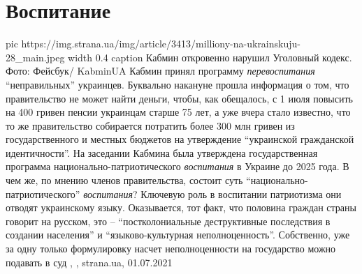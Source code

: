  
 
 
 
 
\chapter{Воспитание}
\label{sec:slova.vospitanie}

\ifcmt
  pic https://img.strana.ua/img/article/3413/milliony-na-ukrainskuju-28_main.jpeg
	width 0.4
	caption Кабмин откровенно нарушил Уголовный кодекс. Фото: Фейсбук/ KabminUA 
\fi
Кабмин принял программу \emph{перевоспитания} \enquote{неправильных} украинцев.
Буквально накануне прошла информация о том, что правительство не может найти
деньги, чтобы, как обещалось, с 1 июля повысить на 400 гривен пенсии украинцам
старше 75 лет, а уже вчера стало известно, что то же правительство собирается
потратить более 300 млн гривен из государственного и местных бюджетов на
утверждение \enquote{украинской гражданской идентичности}. На заседании Кабмина была
утверждена государственная программа национально-патриотического \emph{воспитания} в
Украине до 2025 года.  В чем же, по мнению членов правительства, состоит суть
\enquote{национально-патриотического} \emph{воспитания}? Ключевую роль в воспитании
патриотизма они отводят украинскому языку. Оказывается, тот факт, что половина
граждан страны говорит на русском, это – \enquote{постколониальные деструктивные
последствия в создании населения} и \enquote{языково-культурная неполноценность}.
Собственно, уже за одну только формулировку насчет неполноценности на
государство можно подавать в суд
, 
, strana.ua, 01.07.2021

